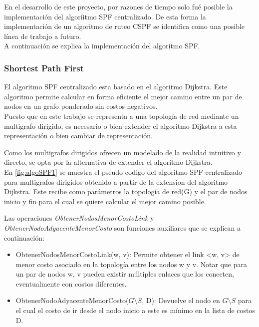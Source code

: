 En el desarrollo de este proyecto, por razones de tiempo solo fu\'e posible la implementaci\'on del algor\'iitmo SPF centralizado. De esta forma la implementaci\'on de un algoritmo de ruteo CSPF se identifica como una posible l\'inea de trabajo a futuro.\\

A continuaci\'on se explica la implementaci\'on del algoritmo SPF. 

\subsubsection{Shortest Path First}
El algoritmo SPF centralizado esta basado en el algoritmo Dijkstra. Este algoritmo permite calcular en forma eficiente el mejor camino entre un par de nodos en un grafo ponderado sin costos negativos.\\

Puesto que en este trabajo se representa a una topolog\'ia de red mediante un multigrafo dirigido, es necesario o bien extender el algoritmo Dijkstra a esta representaci\'on o bien cambiar de representaci\'on. 

Como los multigrafos dirigidos ofrecen un modelado de la realidad intuitivo y directo, se opta por la alternativa de extender el algoritmo Dijkstra.\\

En \ref{fig:algoSPF1} se muestra el pseudo-codigo del algoritmo SPF centralizado para multigrafos dirigidos obtenido a partir de la extension del algoritmo Dijkstra. Este recibe como par\'ametros la topolog\'ia de red(G) y el par de nodos inicio y fin para el cual se quiere calcular el mejor camino posible. 

Las operaciones \textit{ObtenerNodosMenorCostoLink} y \textit{ObtenerNodoAdyacenteMenorCosto} son funciones auxiliares que se explican a continuación:

\begin{itemize}
\item ObtenerNodosMenorCostoLink(w, v): Permite obtener el link <w, v> de menor costo asociado en la topolog\'ia entre los nodos w y v. Notar que para un par de nodos w, v pueden existir m\'ultiples enlaces que los conecten, eventualmente con costos diferentes. 

\item ObtenerNodoAdyacenteMenorCosto($G\setminus S$, D): Devuelve el nodo en $G\setminus S$ para el cual el costo de ir desde el nodo inicio a este es m\'inimo en la lista de costos D.
\end{itemize}


